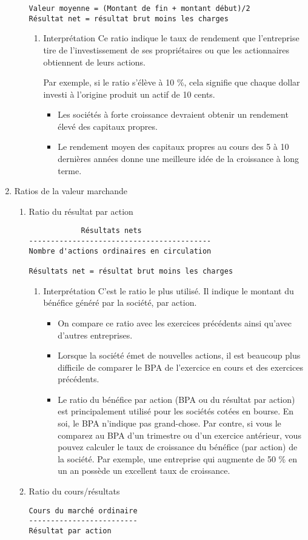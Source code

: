 \documentclass[11pt]{article}
\begin{document}
\begin{enumerate}
\begin{enumerate}
\begin{verbatim}
Valeur moyenne = (Montant de fin + montant début)/2
Résultat net = résultat brut moins les charges
\end{verbatim}
\begin{enumerate}
\item Interprétation
\label{sec:org4744751}
Ce ratio indique le taux de rendement que l'entreprise tire de l'investissement
de ses propriétaires ou que les actionnaires obtiennent de leurs actions.

Par exemple, si le ratio s'élève à 10 \%, cela signifie que chaque dollar investi
à l'origine produit un actif de 10 cents.

\begin{itemize}
\item Les sociétés à forte croissance devraient obtenir un rendement élevé des capitaux
propres.
\item Le rendement moyen des capitaux propres au cours des 5 à 10 dernières années
donne une meilleure idée de la croissance à long terme.
\end{itemize}
\end{enumerate}
\end{enumerate}

\item Ratios de la valeur marchande
\label{sec:orgae5062a}
\begin{enumerate}
\item Ratio du résultat par action
\label{sec:orgcec9e1c}
\begin{verbatim}
            Résultats nets
------------------------------------------
Nombre d'actions ordinaires en circulation

Résultats net = résultat brut moins les charges
\end{verbatim}
\begin{enumerate}
\item Interprétation
\label{sec:org3292954}
C'est le ratio le plus utilisé. Il indique le montant du bénéfice généré par la
société, par action.
\begin{itemize}
\item On compare ce ratio avec les exercices précédents ainsi qu’avec d’autres
entreprises.
\item Lorsque la société émet de nouvelles actions, il est beaucoup plus difficile
de comparer le BPA de l'exercice en cours et des exercices précédents.
\item Le ratio du bénéfice par action (BPA ou du résultat par action) est
principalement utilisé pour les sociétés cotées en bourse. En soi, le BPA
n'indique pas grand-chose. Par contre, si vous le comparez au BPA d'un
trimestre ou d'un exercice antérieur, vous pouvez calculer le taux de
croissance du bénéfice (par action) de la société. Par exemple, une entreprise
qui augmente de 50 \% en un an possède un excellent taux de croissance.
\end{itemize}
\end{enumerate}
\item Ratio du cours/résultats
\label{sec:org8fe9b24}
\begin{verbatim}
Cours du marché ordinaire
-------------------------
Résultat par action


\end{verbatim}
\end{enumerate}
\end{enumerate}
\end{document}
